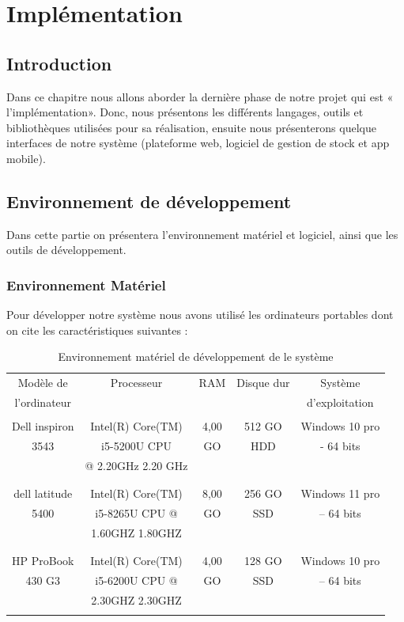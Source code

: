 \documentclass[edit,12pt,a4paper,ChapStyle,oneside,doubleinterligne]{report}
\begin{document}
\chapter{Implémentation}
\section{Introduction}
Dans ce chapitre nous allons aborder la dernière phase de notre projet qui est « l’implémentation». Donc, nous présentons les différents langages, outils et bibliothèques utilisées pour sa réalisation, ensuite nous présenterons quelque interfaces de notre système (plateforme web, logiciel de gestion de stock et app mobile).
\section{Environnement de développement }
Dans cette partie on présentera l'environnement matériel et logiciel, ainsi que les outils de développement. 
\subsection{Environnement Matériel }
Pour développer notre système nous avons utilisé les ordinateurs portables dont on cite les caractéristiques suivantes :  
\begin{table}[h!]
    \centering
    \begin{tabular}{|c|c|c|c|c|}
    \hline
        Modèle de & Processeur & RAM & Disque dur & Système  \\
        l’ordinateur & & & & d’exploitation \\
        \hline
        &&&&\\
         Dell inspiron & Intel(R) Core(TM)   & 4,00  & 512 GO & Windows 10 pro  \\
         3543 & i5-5200U CPU & GO  & HDD & - 64 bits \\
         & @ 2.20GHz   2.20 GHz & & &\\
         &&&&\\
         \hline
        &&&&\\
         dell latitude  & Intel(R) Core(TM)  & 8,00 & 256 GO & Windows 11 pro  \\
         5400 & i5-8265U CPU @ & GO & SSD & – 64 bits \\
         & 1.60GHZ 1.80GHZ & & &\\
         &&&&\\
         \hline
         &&&&\\
         HP ProBook  & Intel(R) Core(TM)   & 4,00& 128 GO  & Windows 10 pro  \\
         430 G3 & i5-6200U CPU @ & GO & SSD & – 64 bits\\
         & 2.30GHZ 2.30GHZ & & &\\
         &&&&\\
         \hline
    \end{tabular}
    \caption{Environnement matériel de développement de le système}
    \label{tab:materiel}
\end{table}
\end{document}
